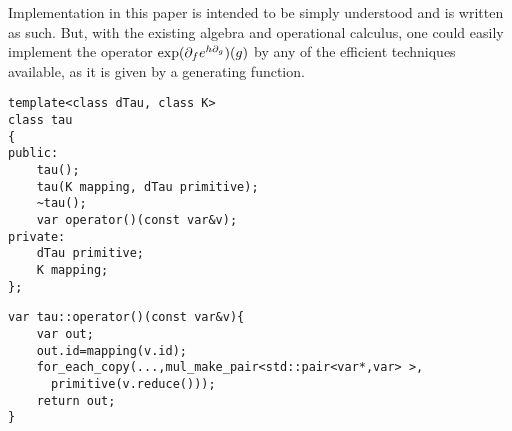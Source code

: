           \begin{opomba}
          Implementation in this paper is intended to be simply understood and is written as such. But, with the existing algebra and operational calculus, one could easily implement the operator $\exp(\partial_fe^{h\partial_g})(g)$ by any of the efficient techniques available, as it is given by a generating function.
          \end{opomba}
        
\begin{lstlisting}
template<class dTau, class K>
class tau
{
public:
    tau();
    tau(K mapping, dTau primitive);
    ~tau();
    var operator()(const var&v);
private:
    dTau primitive;
    K mapping;
};
\end{lstlisting}        
        
\begin{lstlisting}
var tau::operator()(const var&v){
    var out;
    out.id=mapping(v.id);
    for_each_copy(...,mul_make_pair<std::pair<var*,var> >, 
      primitive(v.reduce()));
    return out;
}
\end{lstlisting}
